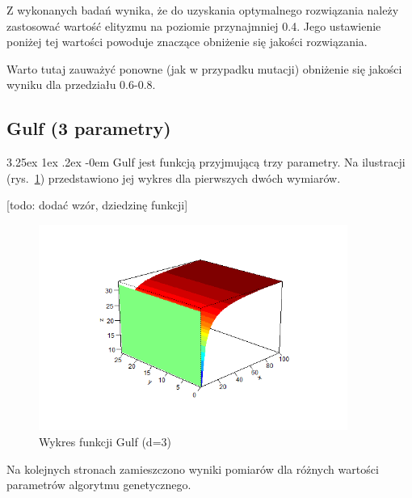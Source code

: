 \documentclass[11pt, a4paper]{article}
\makeatletter
\newcommand{\fbi}{\leavevmode{\parindent=1em\indent}}
\renewcommand\paragraph{\@startsection{paragraph}{5}{\z@}%
  {3.25ex \@plus1ex \@minus.2ex}%
  {-0em}%
  {\normalfont\normalsize\bfseries}}
\makeatother
\begin{document}
\fbi
Z wykonanych badań wynika, że do uzyskania optymalnego rozwiązania należy zastosować wartość elityzmu na poziomie przynajmniej 0.4. Jego ustawienie poniżej tej wartości powoduje znaczące obniżenie się jakości rozwiązania.

\fbi
Warto tutaj zauważyć ponowne (jak w przypadku mutacji) obniżenie się jakości wyniku dla przedziału 0.6-0.8.

\newpage
\subsection{Gulf (3 parametry)}
\paragraph{}
Gulf jest funkcją przyjmującą trzy parametry. Na ilustracji (rys.~\ref{fig:gulf1}) przedstawiono jej wykres dla pierwszych dwóch wymiarów.

[todo: dodać wzór, dziedzinę funkcji]


\begin{figure}[H]
	\begin{center}
		\includegraphics[width=0.9\textwidth]{./assets/Gulf1.png} %
		\caption{Wykres funkcji Gulf (d=3)}
		\label{fig:gulf1}
	\end{center}
\end{figure}

\fbi
Na kolejnych stronach zamieszczono wyniki pomiarów dla różnych wartości parametrów algorytmu genetycznego.
\end{document}
